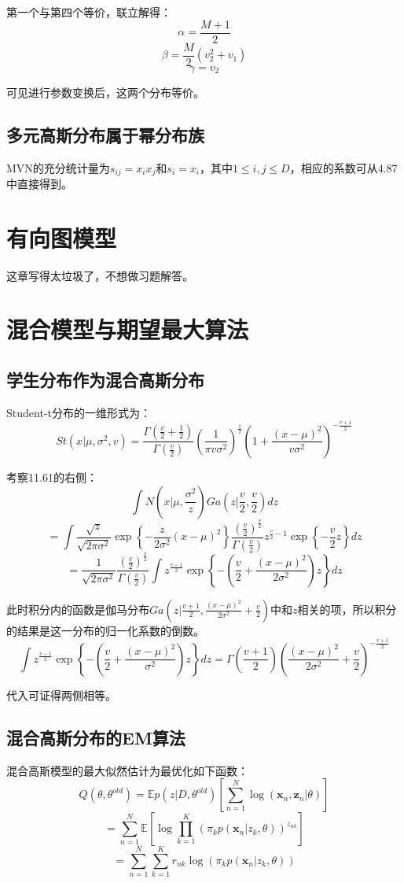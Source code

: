 \documentclass[UTF8]{ctexart}
\begin{document}
第一个与第四个等价，联立解得：
$$\alpha = \frac{M+1}{2}$$
$$\beta = \frac{M}{2}(v_{2}^{2}+v_{1})$$
$$\gamma = v_{2}$$

可见进行参数变换后，这两个分布等价。

\subsection{多元高斯分布属于幂分布族}
MVN的充分统计量为$s_{ij}=x_{i}x_{j}$和$s_{i}=x_{i}$，其中$1 \leq i,j \leq D$，相应的系数可从4.87中直接得到。

\newpage
\section{有向图模型}
这章写得太垃圾了，不想做习题解答。

\newpage
\section{混合模型与期望最大算法}
\subsection{学生分布作为混合高斯分布}
Student-t分布的一维形式为：
$$St(x|\mu,\sigma^{2},v)=\frac{\Gamma(\frac{v}{2}+\frac{1}{2})}{\Gamma(\frac{v}{2})}(\frac{1}{\pi v \sigma^{2}})^{\frac{1}{2}}(1+\frac{(x-\mu)^{2}}{v\sigma^{2}})^{-\frac{v+1}{2}}$$

考察11.61的右侧：
$$\int N(x|\mu,\frac{\sigma^{2}}{z})Ga(z|\frac{v}{2},\frac{v}{2})dz$$
$$=\int \frac{\sqrt{z}}{\sqrt{2\pi\sigma^{2}}}\exp\left\{ -\frac{z}{2\sigma^{2}}(x-\mu)^{2} \right\}\frac{(\frac{v}{2})^{\frac{v}{2}}}{\Gamma(\frac{v}{2})}z^{\frac{v}{2}-1}\exp\left\{ -\frac{v}{2}z \right\}dz$$
$$=\frac{1}{\sqrt{2\pi \sigma^{2}}}\frac{(\frac{v}{2})^{\frac{v}{2}}}{\Gamma(\frac{v}{2})}\int z^{\frac{v-1}{2}}\exp\left\{ -(\frac{v}{2}+\frac{(x-\mu)^{2}}{2\sigma^{2}})z \right\} dz$$

此时积分内的函数是伽马分布$Ga(z|\frac{v+1}{2},\frac{(x-\mu)^{2}}{2\sigma^{2}}+\frac{v}{2})$中和$z$相关的项，所以积分的结果是这一分布的归一化系数的倒数。
$$\int z^{\frac{v-1}{2}}\exp\left\{ -(\frac{v}{2}+\frac{(x-\mu)^{2}}{\sigma^{2}})z \right\} dz = \Gamma(\frac{v+1}{2})(\frac{(x-\mu)^{2}}{2\sigma^{2}}+\frac{v}{2})^{-\frac{v+1}{2}}$$

代入可证得两侧相等。

\subsection{混合高斯分布的EM算法}
混合高斯模型的最大似然估计为最优化如下函数：
$$Q(\theta,\theta^{old})=\mathbb{E}p(z|D,\theta^{old})[\sum_{n=1}^{N}\log (\textbf{x}_{n},\textbf{z}_{n}|\theta)]$$
$$=\sum_{n=1}^{N}\mathbb{E}[\log \prod_{k=1}^{K}(\pi_{k}p(\textbf{x}_{n}|z_{k},\theta))^{z_{nk}}]$$
$$=\sum_{n=1}^{N}\sum_{k=1}^{K}r_{nk}\log (\pi_{k}p(\textbf{x}_{n}|z_{k},\theta))$$
\end{document}
